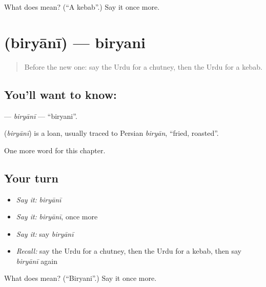 \begin{tcolorbox}[breakable,colback=teal!4,colframe=teal!35!black,title={Before you move on}]
What does  mean? (\textquotedblleft{}A kebab\textquotedblright{}.) Say it once more.
\end{tcolorbox}
\section[\texorpdfstring{\ur{بریانی} (biryānī)}{بریانی (biryānī)}]{ (biryānī) — biryani}

\label{lesson:UR-C120-biryani}



\begin{quote}
Before the new one: say the Urdu for a chutney, then the Urdu for a kebab.
\end{quote}

\subsection*{You'll want to know: }
\textbf{} — \emph{biryānī} — \textquotedblleft{}biryani\textquotedblright{}.

\begin{cousinweb}
\textbf{} (\emph{biryānī}) is a loan, usually traced to Persian \emph{biryān}, \textquotedblleft{}fried, roasted\textquotedblright{}.
\end{cousinweb}

\begin{grammarlens}[title={What you've built}]
One more word for this chapter.
\end{grammarlens}

\subsection*{Your turn}
\begin{itemize}
\raggedright
  \item \emph{Say it:} \emph{biryānī}
  \item \emph{Say it:} \emph{biryānī}, once more
  \item \emph{Say it:} say \emph{biryānī}
  \item \emph{Recall:} say the Urdu for a chutney, then the Urdu for a kebab, then say \emph{biryānī} again
\end{itemize}

\begin{tcolorbox}[breakable,colback=teal!4,colframe=teal!35!black,title={Before you move on}]
What does  mean? (\textquotedblleft{}Biryani\textquotedblright{}.) Say it once more.
\end{tcolorbox}
